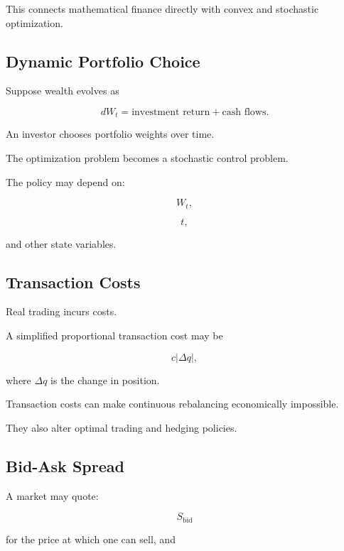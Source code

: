 This connects mathematical finance directly with convex and stochastic
optimization.

\subsection{Dynamic Portfolio Choice}
\label{subsec:dynamic-portfolio-choice}

Suppose wealth evolves as

\[
\boxed{
dW_t
=
\text{investment return}
+
\text{cash flows}.
}
\]

An investor chooses portfolio weights over time.

The optimization problem becomes a stochastic control problem.

The policy may depend on:

\[
\boxed{
W_t,
}
\]

\[
\boxed{
t,
}
\]

and other state variables.

\subsection{Transaction Costs}
\label{subsec:transaction-costs-finance}

Real trading incurs costs.

A simplified proportional transaction cost may be

\[
\boxed{
c|\Delta q|,
}
\]

where \(\Delta q\) is the change in position.

Transaction costs can make continuous rebalancing economically impossible.

They also alter optimal trading and hedging policies.

\subsection{Bid-Ask Spread}
\label{subsec:bid-ask-spread}

A market may quote:

\[
\boxed{
S_{\mathrm{bid}}
}
\]

for the price at which one can sell, and

